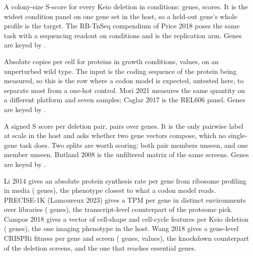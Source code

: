  A colony-size S-score for every Keio deletion
in \nicholsEnv{} conditions: \nicholsGenes{} genes, \nicholsLabels{} scores. It is the
widest condition panel on one gene set in the host, so a held-out gene's whole profile
is the target. The RB-TnSeq compendium of Price 2018 poses the same task with a
sequencing readout on \priceEnv{} conditions and is the replication arm. Genes are keyed by
\nicholsIdentifier{}.

 Absolute copies per cell for \schmidtGenes{} proteins
in \schmidtEnv{} growth conditions, \schmidtLabels{} values, on an unperturbed wild
type. The input is the coding sequence of the protein being measured, so this is the
row where a codon model is expected, untested here, to separate most from a one-hot
control. Mori 2021 measures the same quantity on a different platform and seven
samples; Caglar 2017 is the REL606 panel. Genes are keyed by \schmidtIdentifier{}.

 A signed S score per deletion pair,
\babuLabels{} pairs over \babuGenes{} genes. It is the only pairwise label at scale in
the host and asks whether two gene vectors compose, which no single-gene task does.
Two splits are worth scoring: both pair members unseen, and one member unseen.
Butland 2008 is the unfiltered matrix of the same screens. Genes are keyed by
\babuIdentifier{}.

 Li 2014 gives an absolute protein synthesis rate per gene from
ribosome profiling in \liEnv{} media (\liGenes{} genes), the phenotype closest to what
a codon model reads. PRECISE-1K (Lamoureux 2023) gives a TPM per gene in \preciseEnv{}
distinct environments over \preciseInstances{} libraries (\preciseGenes{} genes), the
transcript-level counterpart of the proteome pick. Campos 2018 gives a vector of
cell-shape and cell-cycle features per Keio deletion (\camposGenes{} genes), the one
imaging phenotype in the host. Wang 2018 gives a gene-level CRISPRi fitness per gene
and screen (\wangGenes{} genes, \wangLabels{} values), the knockdown counterpart of
the deletion screens, and the one that reaches essential genes.


